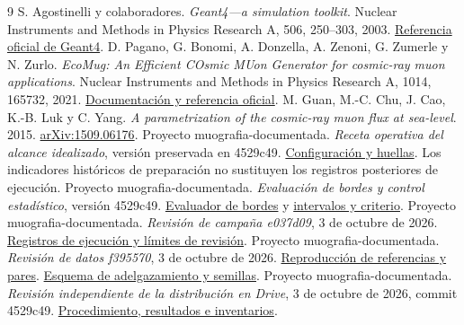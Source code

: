 \documentclass[11pt,a4paper]{article}
\begin{document}
\begin{thebibliography}{9}
 S. Agostinelli y colaboradores. \emph{Geant4---a simulation toolkit}. Nuclear Instruments and Methods in Physics Research A, 506, 250--303, 2003. \href{https://geant4.web.cern.ch/about/publications.html}{Referencia oficial de Geant4}.
 D. Pagano, G. Bonomi, A. Donzella, A. Zenoni, G. Zumerle y N. Zurlo. \emph{EcoMug: An Efficient COsmic MUon Generator for cosmic-ray muon applications}. Nuclear Instruments and Methods in Physics Research A, 1014, 165732, 2021. \href{https://dr4kan.github.io/EcoMug/index.html}{Documentación y referencia oficial}.
 M. Guan, M.-C. Chu, J. Cao, K.-B. Luk y C. Yang. \emph{A parametrization of the cosmic-ray muon flux at sea-level}. 2015. \href{https://arxiv.org/abs/1509.06176}{arXiv:1509.06176}.
 Proyecto muografia-documentada. \emph{Receta operativa del alcance idealizado}, versión preservada en 4529c49. \href{https://github.com/anlegogo/muografia-documentada/blob/4529c49/objetivo-1/contratos/receta-operativa-siete-actividades.json}{Configuración y huellas}. Los indicadores históricos de preparación no sustituyen los registros posteriores de ejecución.
 Proyecto muografia-documentada. \emph{Evaluación de bordes y control estadístico}, versión 4529c49. \href{https://github.com/anlegogo/muografia-documentada/blob/4529c49/herramientas/evaluar_bordes_angular.py}{Evaluador de bordes} y \href{https://github.com/anlegogo/muografia-documentada/blob/4529c49/herramientas/estadistica_control_angular.py}{intervalos y criterio}.
 Proyecto muografia-documentada. \emph{Revisión de campaña e037d09}, 3 de octubre de 2026. \href{https://github.com/anlegogo/muografia-documentada/blob/4529c49/objetivo-1/REVISION_CAMPANA_E037D09.md}{Registros de ejecución y límites de revisión}.
 Proyecto muografia-documentada. \emph{Revisión de datos f395570}, 3 de octubre de 2026. \href{https://github.com/anlegogo/muografia-documentada/blob/4529c49/objetivo-1/REVISION_DATOS_F395570.md}{Reproducción de referencias y pares}. \href{https://github.com/anlegogo/muografia-documentada/blob/4529c49/herramientas/empaquetar_angular_v1.py}{Esquema de adelgazamiento y semillas}.
 Proyecto muografia-documentada. \emph{Revisión independiente de la distribución en Drive}, 3 de octubre de 2026, commit 4529c49. \href{https://github.com/anlegogo/muografia-documentada/blob/4529c49/objetivo-1/REVISION_DISTRIBUCION_DRIVE.md}{Procedimiento, resultados e inventarios}.
\end{thebibliography}
\end{document}
